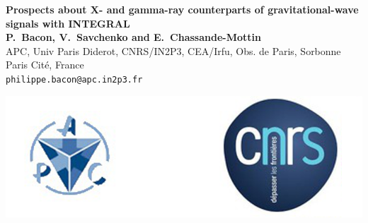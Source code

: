 \documentclass[a0,portrait]{a0poster}
\begin{document}


\begin{minipage}[b]{0.75\linewidth}
  \Huge \textbf{Prospects about X- and gamma-ray counterparts of gravitational-wave signals with INTEGRAL}\\[1cm] %
  \large \textbf{P.~Bacon, V.~Savchenko and E.~Chassande-Mottin}\\[1cm] %
  \normalsize APC, Univ Paris Diderot, CNRS/IN2P3, CEA/Irfu, Obs. de Paris, Sorbonne Paris Cit\'e, France\\
  \large \texttt{philippe.bacon@apc.in2p3.fr}\\
\end{minipage}
%
\begin{minipage}[b]{0.25\linewidth}
	\includegraphics[scale=.8]{logo.png}
\end{minipage}

\vspace{1cm} %

\end{document}
